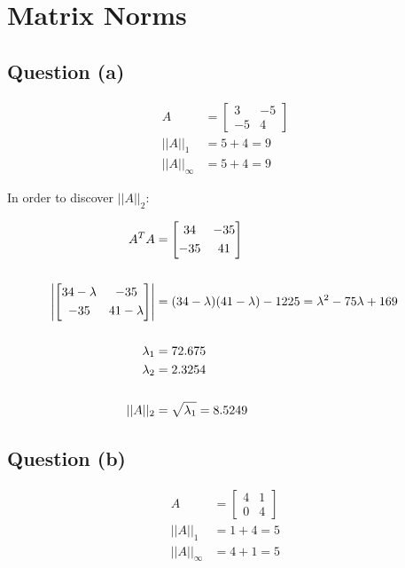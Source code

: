 \section{Matrix Norms}

	\subsection{Question (a)}
		\begin{align}
			A &= \begin{bmatrix}
					3 & -5 \\[0.3em]
					-5 & 4
				\end{bmatrix}& \\
			||A||_{1} &= 5 + 4 = 9& \\
			||A||_{\infty} &= 5 + 4 = 9&
		\label{eq:65a}
		\end{align}

		In order to discover $||A||_{2}$:

		\begin{align}
			A^{T}A &= \begin{bmatrix}
					34 & -35 \\[0.3em]
					-35 & 41
				\end{bmatrix}& \\
				\notag \\
			\left| \begin{bmatrix}
					34-\lambda & -35 \\[0.3em]
					-35 & 41-\lambda
				\end{bmatrix} \right| &=  (34-\lambda)(41-\lambda) - 1225 = \lambda^{2} - 75\lambda + 169& \\
				\notag \\
				\lambda_{1} &= 72.675& \\
				\lambda_{2} &= 2.3254& \\
				\notag \\
				||A||_{2} &= \sqrt{\lambda_{1}} = 8.5249&
		\label{eq:65aeigen}
		\end{align}

	\subsection{Question (b)}
		\begin{align}
			A &= \begin{bmatrix}
					4 & 1 \\[0.3em]
					0 & 4
				\end{bmatrix}& \\
			||A||_{1} &= 1 + 4 = 5& \\
			||A||_{\infty} &= 4 + 1 = 5&
		\label{eq:65b}
		\end{align}

